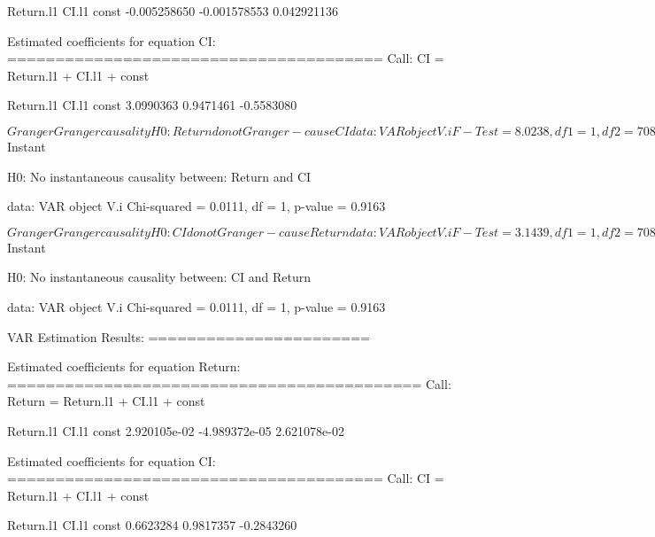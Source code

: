 \documentclass{article}
\begin{document}
\begin{Schunk}
\begin{Soutput}
   Return.l1        CI.l1        const 
-0.005258650 -0.001578553  0.042921136 


Estimated coefficients for equation CI: 
======================================= 
Call:
CI = Return.l1 + CI.l1 + const 

 Return.l1      CI.l1      const 
 3.0990363  0.9471461 -0.5583080 
\end{Soutput}
\begin{Soutput}
$Granger

	Granger causality H0: Return do not Granger-cause CI

data:  VAR object V.i
F-Test = 8.0238, df1 = 1, df2 = 708, p-value = 0.004748


$Instant

	H0: No instantaneous causality between: Return and CI

data:  VAR object V.i
Chi-squared = 0.0111, df = 1, p-value = 0.9163
\end{Soutput}
\begin{Soutput}
$Granger

	Granger causality H0: CI do not Granger-cause Return

data:  VAR object V.i
F-Test = 3.1439, df1 = 1, df2 = 708, p-value = 0.07664


$Instant

	H0: No instantaneous causality between: CI and Return

data:  VAR object V.i
Chi-squared = 0.0111, df = 1, p-value = 0.9163
\end{Soutput}
\begin{Soutput}
VAR Estimation Results:
======================= 

Estimated coefficients for equation Return: 
=========================================== 
Call:
Return = Return.l1 + CI.l1 + const 

    Return.l1         CI.l1         const 
 2.920105e-02 -4.989372e-05  2.621078e-02 


Estimated coefficients for equation CI: 
======================================= 
Call:
CI = Return.l1 + CI.l1 + const 

 Return.l1      CI.l1      const 
 0.6623284  0.9817357 -0.2843260 
\end{Soutput}
\end{Schunk}
\end{document}
